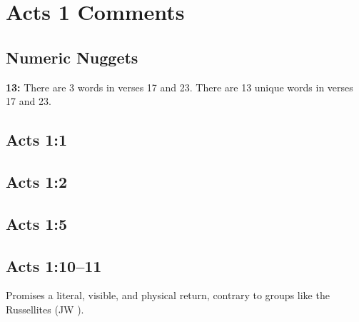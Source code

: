 \section{Acts 1 Comments}

\subsection{Numeric Nuggets}
\textbf{13:} There are 3 words in verses 17 and 23. There are 13 unique words in verses 17 and 23.


\subsection{Acts 1:1}


\subsection{Acts 1:2}

\subsection{Acts 1:5}

\subsection{Acts 1:10–11}
Promises a literal, visible, and physical return, contrary to groups like the Russellites (JW ).